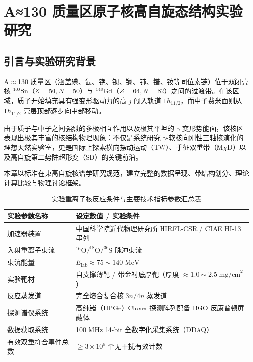 
\chapter{A≈130 质量区原子核高自旋态结构实验研究}
\label{ch:case_study}

\section{引言与实验研究背景}
\label{sec:case_intro}

A$\approx$130 质量区（涵盖碘、氙、铯、钡、镧、铈、镨、钕等同位素链）位于双闭壳核 $^{100}\text{Sn}$（$Z=50, N=50$）与 $^{146}\text{Gd}$（$Z=64, N=82$）之间的过渡带。在该区域，质子开始填充具有强变形驱动力的高 $j$ 闯入轨道 $1h_{11/2}$，而中子费米面则从 $1h_{11/2}$ 壳层顶部逐步向中部移动。

由于质子与中子之间强烈的多极相互作用以及极其平坦的 $\gamma$ 变形势能面，该核区表现出极其丰富的核结构物理现象：不仅是系统研究 $\gamma$-软核向刚性三轴核演化的理想天然实验室，更是国际上探索横向摆动运动（TW）、手征双重带（M$\chi$D）以及高自旋第二势阱超形变（SD）的关键前沿。

本章以标准在束高自旋核谱学研究规范，建立完整的数据呈现、带结构划分、理论计算比较与物理讨论框架。

\begin{table}[htbp]
    \centering
    \caption{实验重离子核反应条件与主要技术指标参数汇总表}
    \label{tab:reaction_parameters}
    \begin{tabular}{ll}
        \toprule
        实验参数名称 & 设定数值 / 实验条件 \\
        \midrule
        加速器装置 & 中国科学院近代物理研究所 HIRFL-CSR / CIAE HI-13 串列 \\
        入射重离子束流 & $^{16}\text{O} / ^{18}\text{O} / ^{36}\text{S}$ 脉冲束流 \\
        束流能量 & $E_{\text{lab}} \approx 75 \sim 140\text{ MeV}$ \\
        实验靶材 & 自支撑薄靶 / 带金衬底厚靶（厚度 $\approx 1.0\sim 2.5\text{ mg/cm}^2$） \\
        反应蒸发道 & 完全熔合复合核 $3n / 4n$ 蒸发道 \\
        探测谱仪系统 & 高纯锗（HPGe）Clover 探测阵列配备 BGO 反康普顿屏蔽体 \\
        数据获取系统 & 100 MHz 14-bit 全数字化采集系统（DDAQ） \\
        有效双重符合事件总数 & $\ge 3 \times 10^8$ 个无干扰有效计数 \\
        \bottomrule
    \end{tabular}
\end{table}

